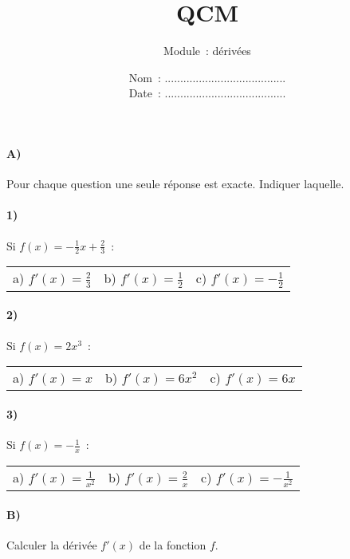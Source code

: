 \documentclass[a4paper]{article}
\begin{document}
  \title{QCM}
  \author{Module~: dérivées}
  \date{
    Nom~: .......................................\\
    \vspace{0.2cm}
    Date~: .......................................}
  \maketitle
  
  \paragraph{A)}
  Pour chaque question une seule réponse est exacte. Indiquer laquelle.
  \paragraph{1)}
  Si $\displaystyle f(x) = - \frac{1}{2} x + \frac{2}{3}$~:
  \begin{center}
    \begin{tabular}{p{3cm}p{3cm}p{3cm}}
      a) $\displaystyle f'(x) = \frac{2}{3}$ & b) $\displaystyle f'(x) = \frac{1}{2}$ & c) $\displaystyle f'(x) = - \frac{1}{2}$
    \end{tabular}
  \end{center}

  \paragraph{2)}
  Si $f(x) = 2 x^3$~:
  \begin{center}
    \begin{tabular}{p{3cm}p{3cm}p{3cm}}
      a) $f'(x) = x$ & b) $f'(x) = 6 x^2$ & c) $f'(x) = 6x$
    \end{tabular}
  \end{center}

  \paragraph{3)}
  Si $\displaystyle f(x) = - \frac{1}{x}$~:
  \begin{center}
    \begin{tabular}{p{3cm}p{3cm}p{3cm}}
      a) $\displaystyle f'(x) = \frac{1}{x^2}$ & b) $\displaystyle f'(x) = \frac{2}{x}$ & c) $\displaystyle f'(x) = - \frac{1}{x^2}$
    \end{tabular}
  \end{center}

  \paragraph{B)}
  Calculer la dérivée $f'(x)$ de la fonction $f$.
\end{document}
